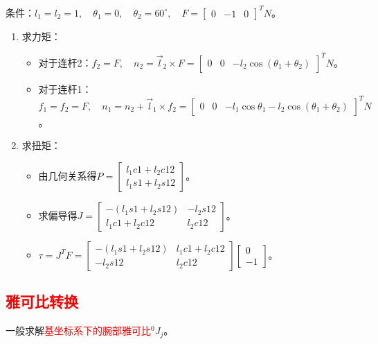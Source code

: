 \documentclass[
12pt, %
a4paper, 
oneside, %
]{scrartcl}
\begin{document}
{\footnotesize
条件：$ l_1 = l_2 = 1, \quad \theta_1 = 0, \quad \theta_2 = 60^\circ, \quad F = \begin{bmatrix} 0 & -1 & 0 \end{bmatrix}^T N $。
\begin{enumerate}
\item 求力矩：
\begin{itemize}
\item 对于连杆2：$ f_2 = F, \quad n_2 = \vec{l}_2 \times F = \begin{bmatrix} 0 & 0 & -l_2 \cos(\theta_1 + \theta_2) \end{bmatrix}^T N $。
\item 对于连杆1：$ f_1 = f_2 = F, \quad n_1 = n_2 + \vec{l}_1 \times f_2 = \begin{bmatrix} 0 & 0 & -l_1 \cos\theta_1 - l_2 \cos(\theta_1 + \theta_2) \end{bmatrix}^T N $。
\end{itemize} 
\item 求扭矩：
\begin{itemize}
\item 由几何关系得$ P = \begin{bmatrix} l_1 c1 + l_2 c12 \\ l_1 s1 + l_2 s12 \end{bmatrix} $。
\item 求偏导得$ J = \begin{bmatrix} -(l_1 s1 + l_2 s12) & -l_2 s12 \\ l_1 c1 + l_2 c12 & l_2 c12 \end{bmatrix} $。
\item $ \tau = J^T F = \begin{bmatrix} -(l_1 s1 + l_2 s12) & l_1 c1 + l_2 c12 \\ - l_2 s12 & l_2 c12 \end{bmatrix} \begin{bmatrix} 0 \\ -1 \end{bmatrix} $。
\end{itemize} 
\end{enumerate}
}
\subsection[雅可比转换]{\textcolor{red}{雅可比转换}}\label{sec:Jacobian transform}\label{sec:bingxing_back1}
一般求解\textcolor{red}{基坐标系下的腕部雅可比}$ ^0 J_j $。
\end{document}
